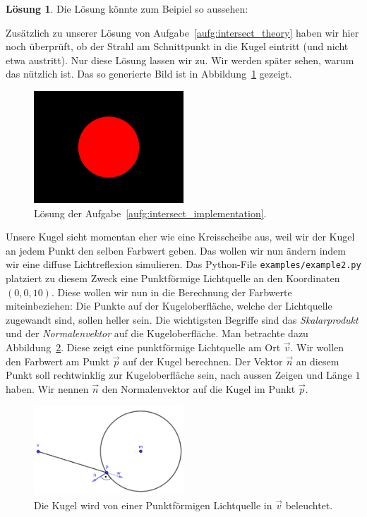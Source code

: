 \documentclass[12pt,a4paper]{article}
\theoremstyle{definition}
\theoremstyle{definition}
\newtheorem*{losung*}{Lösung}
\begin{document}
\begin{losung*}
	Die Lösung könnte zum Beipiel so aussehen:
	
	Zusätzlich zu unserer Lösung von Aufgabe~\ref{aufg:intersect_theory} haben wir hier noch überprüft, ob der Strahl am Schnittpunkt in die Kugel eintritt (und nicht etwa austritt).
	Nur diese Lösung lassen wir zu.
	Wir werden später sehen, warum das nützlich ist.
	Das so generierte Bild ist in Abbildung~\ref{fig:solution_sphere} gezeigt.
	\begin{figure}[ht]
		\centering
		\includegraphics[width=0.5\textwidth]{images/example1.png}
		\caption{Lösung der Aufgabe~\ref{aufg:intersect_implementation}.}
		\label{fig:solution_sphere}
	\end{figure}
\end{losung*}
Unsere Kugel sieht momentan eher wie eine Kreisscheibe aus, weil wir der Kugel an jedem Punkt den selben Farbwert geben.
Das wollen wir nun ändern indem wir eine diffuse Lichtreflexion simulieren.
Das Python-File \texttt{examples/example2.py} platziert zu diesem Zweck eine Punktförmige Lichtquelle an den Koordinaten $(0,0,10)$.
Diese wollen wir nun in die Berechnung der Farbwerte miteinbeziehen:
Die Punkte auf der Kugeloberfläche, welche der Lichtquelle zugewandt sind, sollen heller sein.
Die wichtigsten Begriffe sind das \textit{Skalarprodukt} und der \textit{Normalenvektor} auf die Kugeloberfläche.
Man betrachte dazu Abbildung~\ref{fig:sphere_diffuse}.
Diese zeigt eine punktförmige Lichtquelle am Ort $\vec{v}$.
Wir wollen den Farbwert am Punkt $\vec{p}$ auf der Kugel berechnen. Der Vektor $\vec{n}$ an diesem Punkt soll rechtwinklig zur Kugeloberfläche sein, nach aussen Zeigen und Länge $1$ haben. Wir nennen $\vec{n}$ den Normalenvektor auf die Kugel im Punkt $\vec{p}$.
\begin{figure}[ht]
	\centering
	\includegraphics[width=0.5\textwidth]{images/sphere_diffuse.pdf}
	\caption{Die Kugel wird von einer Punktförmigen Lichtquelle in $\vec{v}$ beleuchtet.}
\label{fig:sphere_diffuse}
\end{figure}
\end{document}
